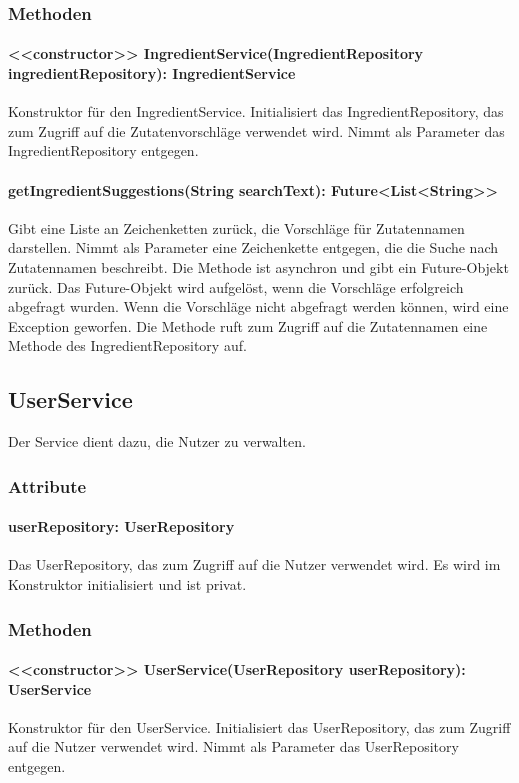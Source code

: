 \documentclass[parskip=full]{scrartcl}
\begin{document}
\subsubsection*{Methoden}
\paragraph{<<constructor>> IngredientService(IngredientRepository ingredientRepository): IngredientService}
Konstruktor für den IngredientService. Initialisiert das IngredientRepository, das zum Zugriff auf die Zutatenvorschläge verwendet wird. Nimmt als Parameter das IngredientRepository entgegen.
\paragraph{getIngredientSuggestions(String searchText): Future<List<String>>}
Gibt eine Liste an Zeichenketten zurück, die Vorschläge für Zutatennamen darstellen. Nimmt als Parameter eine Zeichenkette entgegen, die die Suche nach Zutatennamen beschreibt. Die Methode ist asynchron und gibt ein Future-Objekt zurück. Das Future-Objekt wird aufgelöst, wenn die Vorschläge erfolgreich abgefragt wurden. Wenn die Vorschläge nicht abgefragt werden können, wird eine Exception geworfen. Die Methode ruft zum Zugriff auf die Zutatennamen eine Methode des IngredientRepository auf.

\newpage
\subsection{UserService}
Der Service dient dazu, die Nutzer zu verwalten.
\subsubsection*{Attribute}
\paragraph{userRepository: UserRepository}
Das UserRepository, das zum Zugriff auf die Nutzer verwendet wird. Es wird im Konstruktor initialisiert und ist privat.
\subsubsection*{Methoden}
\paragraph{<<constructor>> UserService(UserRepository userRepository): UserService}
Konstruktor für den UserService. Initialisiert das UserRepository, das zum Zugriff auf die Nutzer verwendet wird. Nimmt als Parameter das UserRepository entgegen.
\end{document}
